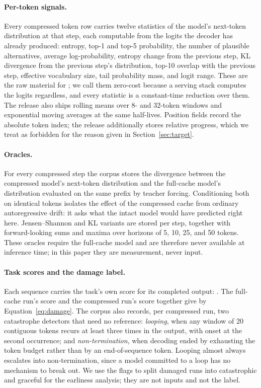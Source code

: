 \paragraph{Per-token signals.}
Every compressed token row carries twelve statistics of the model's
next-token distribution at that step, each computable from the logits the
decoder has already produced: entropy, top-1 and top-5 probability, the
number of plausible alternatives, average log-probability, entropy change
from the previous step, KL divergence from the previous step's distribution,
top-10 overlap with the previous step, effective vocabulary size, tail
probability mass, and logit range. These are the raw material for \info; we
call them zero-cost because a serving stack computes the logits regardless,
and every statistic is a constant-time reduction over them. The release also
ships rolling means over 8- and 32-token windows and exponential moving
averages at the same half-lives. Position fields record the absolute token
index; the release additionally stores relative progress, which we treat as
forbidden for the reason given in Section~\ref{sec:target}.

\paragraph{Oracles.}
For every compressed step the corpus stores the divergence between the
compressed model's next-token distribution and the full-cache model's
distribution evaluated on the same prefix by teacher forcing. Conditioning
both on identical tokens isolates the effect of the compressed cache from
ordinary autoregressive drift: it asks what the intact model would have
predicted right here. Jensen--Shannon and KL variants are stored per step,
together with forward-looking sums and maxima over horizons of 5, 10, 25, and
50 tokens. These oracles require the full-cache model and are therefore never
available at inference time; in this paper they are measurement, never input.

\paragraph{Task scores and the damage label.}
Each sequence carries the task's own score for its completed output:
. The full-cache run's score and the
compressed run's score together give \dmg{} by Equation~\ref{eq:damage}. The
corpus also records, per compressed run, two catastrophe detectors that need
no reference: \emph{looping}, when any window of 20 contiguous tokens
recurs at least three times in the output, with onset at the second
occurrence; and \emph{non-termination}, when decoding ended by exhausting the
token budget rather than by an end-of-sequence token. Looping almost always
escalates into non-termination, since a model committed to a loop has no
mechanism to break out. We use the flags to split damaged runs into
catastrophic and graceful for the earliness analysis; they are not inputs and
not the label.

